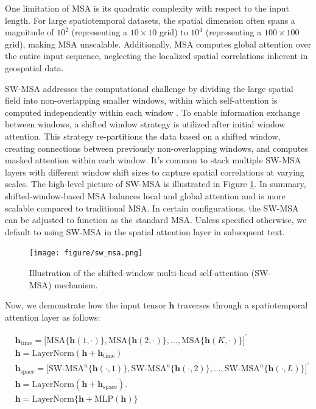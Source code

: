 \documentclass[11pt]{article}
\begin{document}
One limitation of MSA is its quadratic complexity with respect to the input length. For large spatiotemporal datasets, the spatial dimension often spans a magnitude of $10^2$ (representing a $10\times 10$ grid) to $10^4$ (representing a $100 \times 100$ grid), making MSA unscalable. Additionally, MSA computes global attention over the entire input sequence, neglecting the localized spatial correlations inherent in geospatial data. 

SW-MSA addresses the computational challenge by dividing the large spatial field into non-overlapping smaller windows, within which self-attention is computed independently within each window \citep{liu2021swin}. To enable information exchange between windows, a shifted window strategy is utilized after initial window attention. This strategy re-partitions the data based on a shifted window, creating connections between previously non-overlapping windows, and computes masked attention within each window. It's common to stack multiple SW-MSA layers with different window shift sizes to capture spatial correlations at varying scales. The high-level picture of SW-MSA is illustrated in Figure \ref{fig: sw_msa}. In summary, shifted-window-based MSA balances local and global attention and is more scalable compared to traditional MSA. In certain configurations, the SW-MSA can be adjusted to function as the standard MSA. Unless specified otherwise, we default to using SW-MSA in the spatial attention layer in subsequent text.



\begin{figure}
\centering
\texttt{[image: figure/sw\_msa.png]}
\caption{Illustration of the shifted-window multi-head self-attention (SW-MSA) mechanism.}
\label{fig: sw_msa}
\end{figure}




Now, we demonstrate how the input tensor $\boldsymbol{h}$ traverses through a spatiotemporal attention layer as follows:



\begin{align}
		&\boldsymbol{h}_{\text{time}} = \big[\text{MSA}\{\boldsymbol{h}(1,\cdot)\}, \text{MSA}\{\boldsymbol{h}(2,\cdot)\}, \ldots, \text{MSA}\{\boldsymbol{h}(K,\cdot)\}\big]^{\prime}\\
		&\boldsymbol{h}= \text{LayerNorm}(\boldsymbol{h}+ \boldsymbol{h}_{\text{time}})\\
		&\boldsymbol{h}_{\text{space}} = \big[\text{SW-MSA}^n\{\boldsymbol{h}(\cdot, 1)\}, \text{SW-MSA}^n\{\boldsymbol{h}(\cdot, 2)\}, \ldots, \text{SW-MSA}^n\{\boldsymbol{h}(\cdot, L)\}\big]^{\prime}\\
		&\boldsymbol{h}= \text{LayerNorm}(\boldsymbol{h}+ \boldsymbol{h}_{\text{space}}).\\
		& \boldsymbol{h} = \text{LayerNorm}\{\boldsymbol{h} + \text{MLP}(\boldsymbol{h})\}
\end{align}
\end{document}

